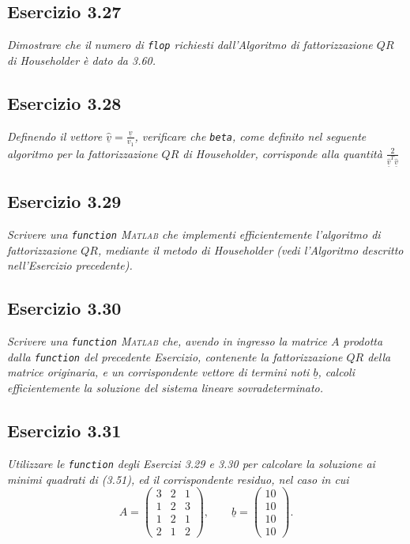 \subsection{Esercizio 3.27}
\emph{Dimostrare che il numero di \texttt{flop} richiesti dall'Algoritmo di fattorizzazione $QR$ di Householder è dato da 3.60.}
\subsection{Esercizio 3.28}
\emph{Definendo il vettore $\underline{\hat{v}}=\frac{\underline{v}}{v_1}$, verificare che \lstinline{beta}, come definito nel seguente algoritmo per la fattorizzazione $QR$ di Householder, corrisponde alla quantità $\frac{2}{\underline{\hat{v}}^T\underline{\hat{v}}}$}
\subsection{Esercizio 3.29}
\emph{Scrivere una \lstinline{function} \textsc{Matlab} che implementi efficientemente l'algoritmo di fattorizzazione $QR$, mediante il metodo di Householder (vedi l'Algoritmo descritto nell'Esercizio precedente).}
\subsection{Esercizio 3.30}
\emph{Scrivere una \lstinline{function} \textsc{Matlab} che, avendo in ingresso la matrice $A$ prodotta dalla \lstinline{function} del precedente Esercizio, contenente la fattorizzazione $QR$ della matrice originaria, e un corrispondente vettore di termini noti $\underline{b}$, calcoli efficientemente la soluzione del sistema lineare sovradeterminato.}
\subsection{Esercizio 3.31}
\emph{Utilizzare le \lstinline{function} degli Esercizi 3.29 e 3.30 per calcolare la soluzione ai minimi quadrati di (3.51), ed il corrispondente residuo, nel caso in cui}
\[
  A=
  \begin{pmatrix}
    3 & 2 & 1\\
    1 & 2 & 3\\
    1 & 2 & 1\\
    2 & 1 & 2
  \end{pmatrix},
  \qquad \underline{b}=
  \begin{pmatrix}
    10\\
    10\\
    10\\
    10
  \end{pmatrix}.
\]
